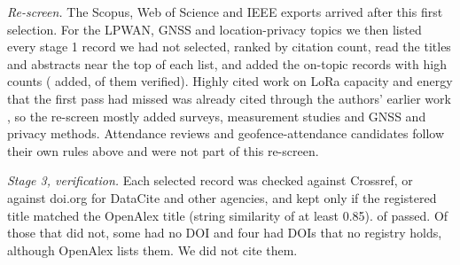 \documentclass[preprint,12pt]{elsarticle}
\begin{document}
\emph{Re-screen.} The Scopus, Web of Science and IEEE exports arrived after this first selection. For the LPWAN, GNSS and location-privacy topics we then listed every stage 1 record we had not selected, ranked by citation count, read the titles and abstracts near the top of each list, and added the on-topic records with high counts (\nRescreen{} added, \nRescreenVer{} of them verified). Highly cited work on LoRa capacity and energy that the first pass had missed was already cited through the authors' earlier work \cite{bor2016scale,georgiou2017scale,casals2017energy}, so the re-screen mostly added surveys, measurement studies and GNSS and privacy methods. Attendance reviews and geofence-attendance candidates follow their own rules above and were not part of this re-screen.

\emph{Stage 3, verification.} Each selected record was checked against Crossref, or against doi.org for DataCite and other agencies, and kept only if the registered title matched the OpenAlex title (string similarity of at least 0.85). \nVerified{} of \nSelected{} passed. Of those that did not, some had no DOI and four had DOIs that no registry holds, although OpenAlex lists them. We did not cite them.
\end{document}
